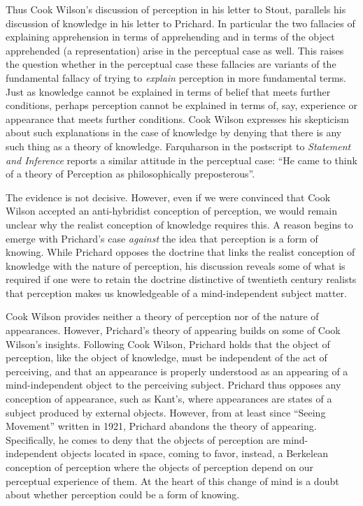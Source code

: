 \documentclass[11pt]{article}
\begin{document}
Thus Cook Wilson's discussion of perception in his letter to Stout, parallels his discussion of knowledge in his letter to Prichard. In particular the two fallacies of explaining apprehension in terms of apprehending and in terms of the object apprehended (a representation) arise in the perceptual case as well. This raises the question whether in the perceptual case these fallacies are variants of the fundamental fallacy of trying to \emph{explain} perception in more fundamental terms. Just as knowledge cannot be explained in terms of belief that meets further conditions, perhaps perception cannot be explained in terms of, say, experience or appearance that meets further conditions. Cook Wilson expresses his skepticism about such explanations in the case of knowledge by denying that there is any such thing as a theory of knowledge. Farquharson in the postscript to \emph{Statement and Inference} reports a similar attitude in the perceptual case: ``He came to think of a theory of Perception as philosophically preposterous''. 

The evidence is not decisive. However, even if we were convinced that Cook Wilson accepted an anti-hybridist conception of perception, we would remain unclear why the realist conception of knowledge requires this. A reason begins to emerge with Prichard's case \emph{against} the idea that perception is a form of knowing. While Prichard opposes the doctrine that links the realist conception of knowledge with the nature of perception, his discussion reveals some of what is required if one were to retain the doctrine distinctive of twentieth century realists that perception makes us knowledgeable of a mind-independent subject matter.

Cook Wilson provides neither a theory of perception nor of the nature of appearances. However, Prichard's \citeyear[]{Prichard:1906gf,Prichard:1909yg} theory of appearing builds on some of Cook Wilson's insights. Following Cook Wilson, Prichard holds that the object of perception, like the object of knowledge, must be independent of the act of perceiving, and that an appearance is properly understood as an appearing of a mind-independent object to the perceiving subject. Prichard thus opposes any conception of appearance, such as Kant's, where appearances are states of a subject produced by external objects. However, from at least since ``Seeing Movement'' written in 1921, Prichard abandons the theory of appearing. Specifically, he comes to deny that the objects of perception are mind-independent objects located in space, coming to favor, instead, a Berkelean conception of perception where the objects of perception depend on our perceptual experience of them. At the heart of this change of mind is a doubt about whether perception could be a form of knowing.
\end{document}
